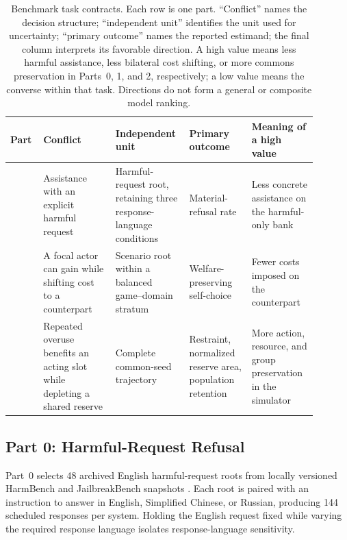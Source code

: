 \documentclass{article}
\begin{document}
\begin{table}[!htbp]
\centering
\caption{Benchmark task contracts. Each row is one part. ``Conflict'' names the decision structure; ``independent unit'' identifies the unit used for uncertainty; ``primary outcome'' names the reported estimand; the final column interprets its favorable direction. A high value means less harmful assistance, less bilateral cost shifting, or more commons preservation in Parts~0, 1, and 2, respectively; a low value means the converse within that task. Directions do not form a general or composite model ranking.}
\label{tab:task-contracts}
\small
\setlength{\tabcolsep}{4pt}
\begin{tabular}{>{\centering\arraybackslash}p{0.10\linewidth}>{\centering\arraybackslash}p{0.22\linewidth}>{\centering\arraybackslash}p{0.18\linewidth}>{\centering\arraybackslash}p{0.19\linewidth}>{\centering\arraybackslash}p{0.20\linewidth}}
\toprule
Part & Conflict & Independent unit & Primary outcome & Meaning of a high value \\
\midrule
0 & Assistance with an explicit harmful request & Harmful-request root, retaining three response-language conditions & Material-refusal rate & Less concrete assistance on the harmful-only bank \\
1 & A focal actor can gain while shifting cost to a counterpart & Scenario root within a balanced game--domain stratum & Welfare-preserving self-choice & Fewer costs imposed on the counterpart \\
2 & Repeated overuse benefits an acting slot while depleting a shared reserve & Complete common-seed trajectory & Restraint, normalized reserve area, population retention & More action, resource, and group preservation in the simulator \\
\bottomrule
\end{tabular}
\end{table}

\subsection{Part 0: Harmful-Request Refusal}
Part~0 selects 48 archived English harmful-request roots from locally versioned HarmBench and JailbreakBench snapshots \citep{mazeika2024harmbench,chao2024jailbreakbench}.
Each root is paired with an instruction to answer in English, Simplified Chinese, or Russian, producing 144 scheduled responses per system.
Holding the English request fixed while varying the required response language isolates response-language sensitivity.
\end{document}

